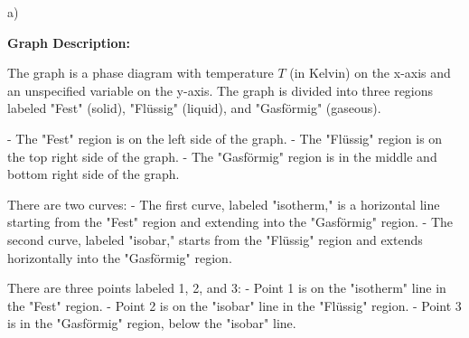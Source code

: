 a)

\begin{center}
\textbf{Graph Description:}
\end{center}

The graph is a phase diagram with temperature \( T \) (in Kelvin) on the x-axis and an unspecified variable on the y-axis. The graph is divided into three regions labeled "Fest" (solid), "Flüssig" (liquid), and "Gasförmig" (gaseous). 

- The "Fest" region is on the left side of the graph.
- The "Flüssig" region is on the top right side of the graph.
- The "Gasförmig" region is in the middle and bottom right side of the graph.

There are two curves:
- The first curve, labeled "isotherm," is a horizontal line starting from the "Fest" region and extending into the "Gasförmig" region.
- The second curve, labeled "isobar," starts from the "Flüssig" region and extends horizontally into the "Gasförmig" region.

There are three points labeled 1, 2, and 3:
- Point 1 is on the "isotherm" line in the "Fest" region.
- Point 2 is on the "isobar" line in the "Flüssig" region.
- Point 3 is in the "Gasförmig" region, below the "isobar" line.